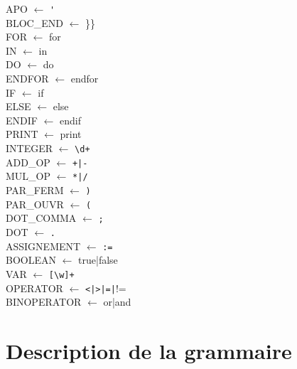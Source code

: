﻿\documentclass{report}
\begin{document}
APO $\leftarrow$ \verb!'!\\

BLOC\_END $\leftarrow$ \}\}\\

FOR $\leftarrow$ for\\

IN $\leftarrow$ in\\

DO $\leftarrow$ do\\

ENDFOR $\leftarrow$ endfor\\

IF $\leftarrow$ if\\

ELSE $\leftarrow$ else\\

ENDIF $\leftarrow$ endif\\

PRINT $\leftarrow$ print\\

INTEGER $\leftarrow$ \verb!\d+!\\

ADD\_OP $\leftarrow$ \verb!+|-!\\

MUL\_OP $\leftarrow$ \verb!*|/!\\

PAR\_FERM $\leftarrow$ \verb!)!\\

PAR\_OUVR $\leftarrow$ \verb!(!\\

DOT\_COMMA $\leftarrow$ \verb!;!\\

DOT $\leftarrow$ \verb!.!\\

ASSIGNEMENT $\leftarrow$ \verb!:=!\\

BOOLEAN $\leftarrow$ true|false\\

VAR $\leftarrow$ \verb![\w]+!\\

OPERATOR $\leftarrow$ \verb!<|>|=|!!=\\

BINOPERATOR $\leftarrow$ or|and\\



\section*{ Description de la grammaire}
\end{document}
